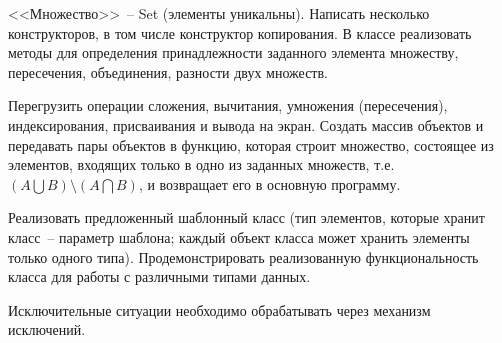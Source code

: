 
<<Множество>>~-- Set (элементы уникальны). Написать несколько конструкторов, в том
числе конструктор копирования. В классе реализовать методы для определения
принадлежности заданного элемента множеству, пересечения, объединения, разности двух
множеств.

Перегрузить операции сложения, вычитания, умножения (пересечения),
индексирования, присваивания и вывода на экран. Создать массив объектов и передавать
пары объектов в функцию, которая строит множество, состоящее из элементов, входящих
только в одно из заданных множеств, т.е. $(A\bigcup B) \setminus (A\bigcap B)$, и возвращает его в основную
программу.

Реализовать предложенный шаблонный класс (тип элементов, которые
хранит класс~-- параметр шаблона; каждый объект класса может хранить
элементы только одного типа). Продемонстрировать реализованную
функциональность класса для работы с различными типами данных.

Исключительные ситуации необходимо обрабатывать через механизм исключений.
